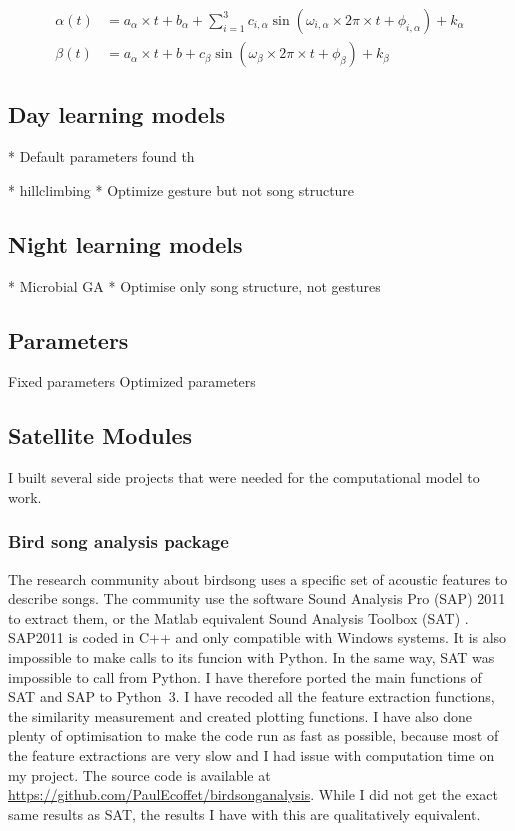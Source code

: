 {\begin{align}
\alpha(t) &= a_\alpha \times t
  + b_\alpha + \sum_{i=1}^{3} c_{i,\alpha} \sin(\omega_{i,\alpha} \times 2\pi
  \times t + \phi_{i,\alpha}) + k_\alpha\\
\beta(t) &= a_\alpha \times t
  + b + c_\beta \sin(\omega_\beta \times 2\pi \times t + \phi_\beta) + k_\beta
\end{align}

\subsection{Day learning models}

* Default parameters found th

* hillclimbing
* Optimize gesture but not song structure


\subsection{Night learning models}

* Microbial GA
* Optimise only song structure, not gestures

\subsection{Parameters}

Fixed parameters
Optimized parameters

\subsection{Satellite Modules}

I built several side projects that were needed for the computational model to
work.



\subsubsection{Bird song analysis package}

The research community about birdsong uses a specific set of acoustic features
to describe songs. The community use the software Sound Analysis Pro (SAP) 2011
to extract them, or the Matlab equivalent Sound Analysis Toolbox (SAT)
\parencite{tchernichovski_procedure_2000}. SAP2011 is coded in C++ and only
compatible with Windows systems. It is also impossible to make calls to its
funcion with Python. In the same way, SAT was impossible to call from Python. I
have therefore ported the main functions of SAT and SAP to Python~3. I have
recoded all the feature extraction functions, the similarity measurement and
created plotting functions. I have also done plenty of optimisation to make the
code run as fast as possible, because most of the feature extractions are very
slow and I had issue with computation time on my project. The source code is
available at \url{https://github.com/PaulEcoffet/birdsonganalysis}. While I did
not get the exact same results as SAT, the results I have with this are
qualitatively equivalent. 

}
